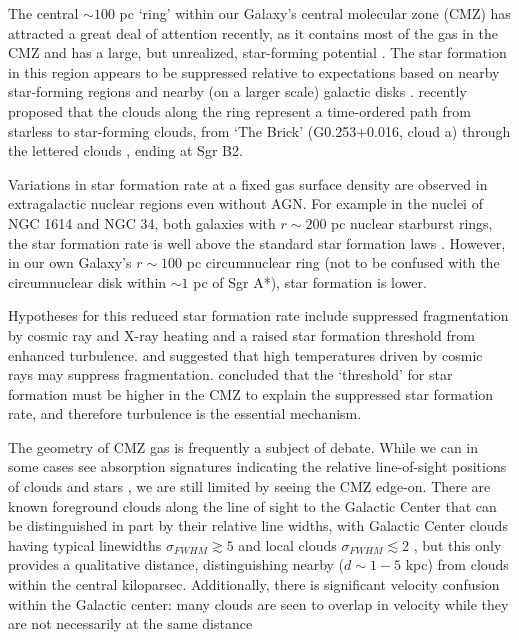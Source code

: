 The central $\sim100$ pc `ring' \citep{Sofue1995a,Molinari2011a} within our Galaxy's
central molecular zone (CMZ) has attracted a great deal of attention recently,
as it contains most of the gas in the CMZ and has a large, but unrealized,
star-forming potential
\citep{Longmore2013a,Longmore2012b,Longmore2012a,Kruijssen2013a,Yusef-Zadeh2009a,Immer2012a}.
The star formation in this region appears to be suppressed relative to
expectations based on nearby star-forming regions and nearby (on a larger
scale) galactic disks
\citep{Kennicutt1998a,Kennicutt2012a,Leroy2013a,Heiderman2010a}.
\citet{Longmore2013a} recently proposed that the clouds along the ring
represent a time-ordered path from starless to star-forming clouds, from `The
Brick' (G0.253+0.016, cloud a) through the lettered clouds \citep[cloud
b,c,d,e,f][]{Lis199a}, ending at Sgr B2.

Variations in star formation rate at a fixed gas surface density are observed
in extragalactic nuclear regions even without AGN.  For example in the nuclei
of NGC 1614 and NGC 34, both galaxies with $r\sim200$ pc nuclear starburst
rings, the star formation rate is well above the standard star formation laws
\citep{Xu2014b}.  However, in our own Galaxy's $r\sim100$ pc circumnuclear ring
(not to be confused with the circumnuclear disk within $\sim1$ pc of Sgr A*),
star formation is lower.

Hypotheses for this reduced star formation rate include suppressed
fragmentation by cosmic ray and X-ray heating and a raised star formation
threshold from enhanced turbulence.  \citet{Papadopoulos2010a} and
\citet{Papadopoulos2011a} suggested that high temperatures driven by cosmic
rays may suppress fragmentation.  \citet{Kruijssen2014c} concluded that the
`threshold' for star formation must be higher in the CMZ to explain the
suppressed star formation rate, and therefore turbulence is the essential
mechanism.  

The geometry of CMZ gas is frequently a subject of debate.  While we can in
some cases see absorption signatures indicating the relative line-of-sight
positions of clouds and stars \citep{Longmore2012b,Yusef-Zadeh2012a}, we are
still limited by seeing the CMZ edge-on.  There are known foreground clouds
along the line of sight to the Galactic Center that can be distinguished in
part by their relative line widths, with Galactic Center clouds having typical
linewidths $\sigma_{FWHM}\gtrsim5$ \kms and local clouds $\sigma_{FWHM}
\lesssim 2$ \kms, but this only provides a qualitative distance, distinguishing
nearby ($d\sim1-5$ kpc) from clouds within the central kiloparsec.  Additionally,
there is significant velocity confusion within the Galactic center: many clouds
are seen to overlap in velocity while they are not necessarily at the same distance
\citep{Jones2012a,Oka2012a}

